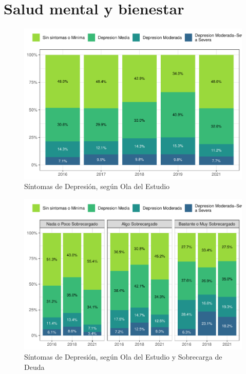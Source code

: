 \documentclass[
  12pt,
]{book}
\begin{document}
\hypertarget{salud-mental-y-bienestar}{%
\chapter{Salud mental y bienestar}\label{salud-mental-y-bienestar}}

\begin{figure}

{\centering \includegraphics{reporte-elsoc_files/figure-latex/depre-wave-1} 

}

\caption{Síntomas de Depresión, según Ola del Estudio}\label{fig:depre-wave}
\end{figure}

\begin{figure}

{\centering \includegraphics{reporte-elsoc_files/figure-latex/depre-deuda-wave-1} 

}

\caption{Síntomas de Depresión, según Ola del Estudio y Sobrecarga de Deuda}\label{fig:depre-deuda-wave}
\end{figure}
\end{document}
